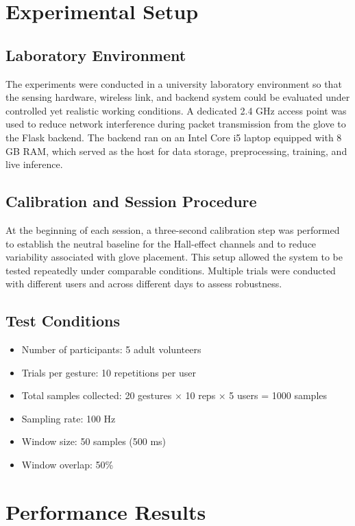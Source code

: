 \documentclass[12pt,a4paper]{report}
\begin{document}
\section{Experimental Setup}
\label{sec:results_setup}

\subsection{Laboratory Environment}
The experiments were conducted in a university laboratory environment so that the sensing hardware, wireless link, and backend system could be evaluated under controlled yet realistic working conditions. A dedicated 2.4 GHz access point was used to reduce network interference during packet transmission from the glove to the Flask backend. The backend ran on an Intel Core i5 laptop equipped with 8 GB RAM, which served as the host for data storage, preprocessing, training, and live inference.

\subsection{Calibration and Session Procedure}
At the beginning of each session, a three-second calibration step was performed to establish the neutral baseline for the Hall-effect channels and to reduce variability associated with glove placement. This setup allowed the system to be tested repeatedly under comparable conditions. Multiple trials were conducted with different users and across different days to assess robustness.

\subsection{Test Conditions}
\begin{itemize}
  \item Number of participants: 5 adult volunteers
  \item Trials per gesture: 10 repetitions per user
  \item Total samples collected: 20 gestures × 10 reps × 5 users = 1000 samples
  \item Sampling rate: 100 Hz
  \item Window size: 50 samples (500 ms)
  \item Window overlap: 50\%
\end{itemize}

\section{Performance Results}
\label{sec:results_performance}
\end{document}
